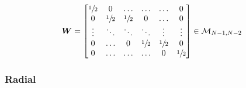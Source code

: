 \documentclass[aps,onecolumn,11pt]{revtex4}
\newcommand{\half}{{\sfrac{1}{2}}}
\newcommand{\mat}[1]{{\bm{#1}}}
\begin{document}
\begin{equation}
	\mat{W} = 
	\begin{bmatrix}
	\half & 0     & \ldots &\ldots & \ldots & 0 \\
	 0    & \half & \half & 0     & \ldots & 0 \\
	 \vdots & \ddots & \ddots & \ddots & \vdots & \vdots \\
	 0      & \ldots & 0& \half& \half  &  0     \\ 
	 0      & \ldots & \ldots & \ldots &  0 & \half \\                
	\end{bmatrix} \in \mathcal{M}_{N-1,N-2}
\end{equation}




\subsubsection{Radial}
\end{document}
